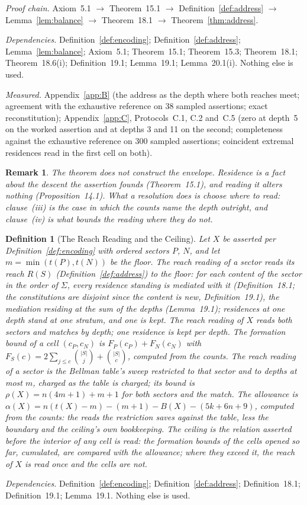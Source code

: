\documentclass[pdflatex,sn-mathphys-num]{sn-jnl}
\theoremstyle{thmstyleone}%
\theoremstyle{thmstyletwo}%
\newtheorem{remark}{Remark}[section]
\theoremstyle{thmstylethree}%
\newtheorem{definition}{Definition}[section]
\newtheorem{remark}{Remark}[section]
\newtheorem{definition}{Definition}[section]
\newcommand{\deps}[1]{\par\begin{sloppypar}\noindent\emph{Dependencies.} #1 Nothing else is used.\end{sloppypar}}
\newcommand{\chain}[1]{\par\begin{sloppypar}\noindent\emph{Proof chain.} #1\end{sloppypar}}
\newcommand{\measured}[1]{\par\begin{sloppypar}\noindent\emph{Measured.} #1\end{sloppypar}}
\begin{document}
\chain{Axiom~5.1 $\to$ Theorem~15.1 $\to$ Definition~\ref{def:address} $\to$ Lemma~\ref{lem:balance} $\to$ Theorem~18.1 $\to$ Theorem~\ref{thm:address}.}
\deps{Definition~\ref{def:encoding}; Definition~\ref{def:address}; Lemma~\ref{lem:balance}; Axiom~5.1; Theorem~15.1; Theorem~15.3; Theorem~18.1; Theorem~18.6(i); Definition~19.1; Lemma~19.1; Lemma~20.1(i).}
\measured{Appendix~\ref{app:B} (the address as the depth where both reaches meet; agreement with the exhaustive reference on 38 sampled assertions; exact reconstitution); Appendix~\ref{app:C}, Protocols~C.1, C.2 and~C.5 (zero at depth~5 on the worked assertion and at depths 3 and 11 on the second; completeness against the exhaustive reference on 300 sampled assertions; coincident extremal residences read in the first cell on both).}

\begin{remark}
The theorem does not construct the envelope. Residence is a fact about the descent the assertion founds (Theorem~15.1), and reading it alters nothing (Proposition~14.1). What a resolution does is choose where to read: clause~(iii) is the case in which the counts name the depth outright, and clause~(iv) is what bounds the reading where they do not.
\end{remark}

\begin{definition}[The Reach Reading and the Ceiling]\label{def:ceiling}
Let $X$ be asserted per Definition~\ref{def:encoding} with ordered sectors $P$, $N$, and let $m=\min(t(P),t(N))$ be the floor. The \emph{reach reading} of a sector reads its reach $R(S)$ (Definition~\ref{def:address}) to the floor: for each content of the sector in the order of $\Sigma$, every residence standing is mediated with it (Definition~18.1; the constitutions are disjoint since the content is new, Definition~19.1), the mediation residing at the sum of the depths (Lemma~19.1); residences at one depth stand at one stratum, and one is kept. The reach reading of $X$ reads both sectors and matches by depth; one residence is kept per depth. The \emph{formation bound} of a cell $(c_P,c_N)$ is $F_P(c_P)+F_N(c_N)$ with $F_S(c)=2\sum_{j\le c}\binom{|S|}{j}+\binom{|S|}{c}$, computed from the counts. The reach reading of a sector is the Bellman table's sweep restricted to that sector and to depths at most $m$, charged as the table is charged; its bound is $\rho(X)=n(4m+1)+m+1$ for both sectors and the match. The \emph{allowance} is $\alpha(X)=n(t(X)-m)-(m+1)-B(X)-(5k+6n+9)$, computed from the counts: the reads the restriction saves against the table, less the boundary and the ceiling's own bookkeeping. The \emph{ceiling} is the relation asserted before the interior of any cell is read: the formation bounds of the cells opened so far, cumulated, are compared with the allowance; where they exceed it, the reach of $X$ is read once and the cells are not.
\end{definition}
\deps{Definition~\ref{def:encoding}; Definition~\ref{def:address}; Definition~18.1; Definition~19.1; Lemma~19.1.}
\end{document}
